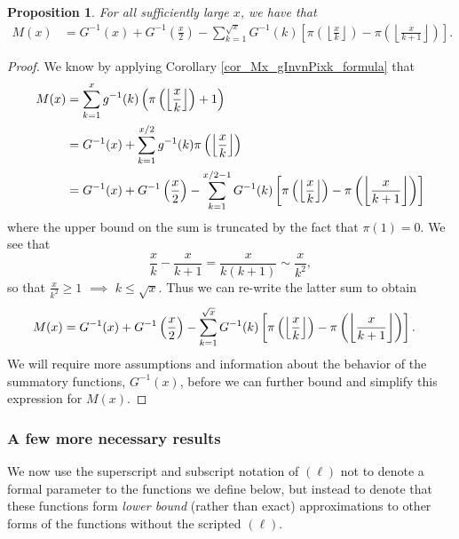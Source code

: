 \documentclass[11pt,reqno,a4letter]{article}
\numberwithin{figure}{section}
\numberwithin{table}{section}
\newcommand{\Floor}[2]{\ensuremath{\left\lfloor \frac{#1}{#2} \right\rfloor}}
\theoremstyle{plain}
\newtheorem{prop}[theorem]{Proposition}
\numberwithin{theorem}{section}
\theoremstyle{definition}
\begin{document}
\begin{prop} 
\label{prop_Mx_SBP_IntegralFormula} 
For all sufficiently large $x$, we have that 
\begin{align} 
\label{eqn_pf_tag_v2-restated_v2} 
M(x) & = G^{-1}(x) + G^{-1}\left(\frac{x}{2}\right) - 
     \sum_{k=1}^{\sqrt{x}} G^{-1}(k) \left[ 
     \pi\left(\Floor{x}{k}\right) - \pi\left(\Floor{x}{k+1}\right) 
     \right]. 
\end{align} 
\end{prop} 
\begin{proof} 
We know by applying Corollary \ref{cor_Mx_gInvnPixk_formula} that 
\begin{align} 
\notag
M(x) & = \sum_{k=1}^{x} g^{-1}(k) \left(\pi\left(\Floor{x}{k}\right)+1\right) \\ 
\label{eqn_proof_tag_MxFormulaInitSepTerms_v1} 
     & = G^{-1}(x) + \sum_{k=1}^{x/2} g^{-1}(k) \pi\left(\Floor{x}{k}\right) \\ 
     & = G^{-1}(x) + G^{-1}\left(\frac{x}{2}\right) - 
     \sum_{k=1}^{x/2-1} G^{-1}(k) \left[ 
     \pi\left(\Floor{x}{k}\right) - \pi\left(\Floor{x}{k+1}\right) 
     \right] 
\end{align} 
where the upper bound on the sum is truncated by the fact that $\pi(1) = 0$. 
We see that 
\[
\frac{x}{k} - \frac{x}{k+1} = \frac{x}{k(k+1)} \sim \frac{x}{k^2}, 
\]
so that $\frac{x}{k^2} \geq 1$ $\implies$ $k \leq \sqrt{x}$. 
Thus we can re-write the latter sum to obtain 
\begin{align*} 
\notag
M(x) & = G^{-1}(x) + G^{-1}\left(\frac{x}{2}\right) - 
     \sum_{k=1}^{\sqrt{x}} G^{-1}(k) \left[ 
     \pi\left(\Floor{x}{k}\right) - \pi\left(\Floor{x}{k+1}\right) 
     \right].
\end{align*} 
We will require more assumptions and information about the behavior 
of the summatory functions, $G^{-1}(x)$, before we can further bound and 
simplify this expression for $M(x)$. 
\end{proof} 

\subsubsection{A few more necessary results} 
\label{subsubSection_RoutineProofsNeededForMainBoundOnGInvxFunc} 

We now use the superscript and subscript notation of 
$(\ell)$ not to denote a formal parameter to 
the functions we define below, but instead to denote that these functions form 
\emph{lower bound} (rather than exact) 
approximations to other forms of the functions without the scripted $(\ell)$. 
\end{document}
